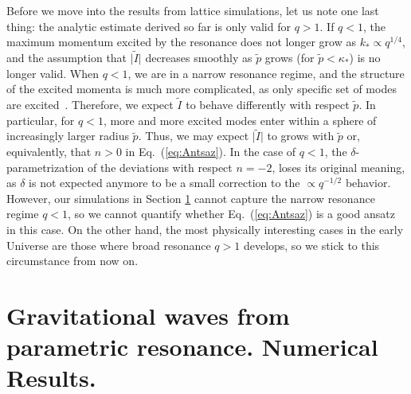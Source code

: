 \documentclass[a4paper,11pt]{article}
\begin{document}
Before we move into the results from lattice simulations, let us note one last thing: the analytic estimate derived so far is only valid for $q > 1$. If $q < 1$, the maximum momentum excited by the resonance does not longer grow as $k_* \propto q^{1/4}$, and the assumption that $\big|\tilde I\big|$ decreases smoothly as $\tilde p$ grows (for $\tilde p < \kappa_*$) is no longer valid. When $q < 1$, we are in a narrow resonance regime, and the structure of the excited momenta is much more complicated, as only specific set of modes are excited~\cite{Kofman:1997yn}. Therefore, we expect $\tilde I$ to behave differently with respect $\tilde p$. In particular, for $q < 1$, more and more excited modes enter within a sphere of increasingly larger radius $\tilde p$. Thus, we may expect $\big|\tilde I\big|$ to grows with $\tilde p$ or, equivalently, that $n > 0$ in Eq.~(\ref{eq:Antsaz}). In the case of $q < 1$, the $\delta$-parametrization of the deviations with respect $n = -2$, loses its original meaning, as $\delta$ is not expected anymore to be a small correction to the $\propto q^{-1/2}$ behavior. However, our simulations in Section \ref{sec:lattice} cannot capture the narrow resonance regime $q < 1$, so we cannot quantify whether Eq.~(\ref{eq:Antsaz}) is a good ansatz in this case. On the other hand, the most physically interesting cases in the early Universe are those where broad resonance $q > 1$ develops, so we stick to this circumstance from now on.

\section{Gravitational waves from parametric resonance. Numerical Results.} \label{sec:lattice}
\end{document}

